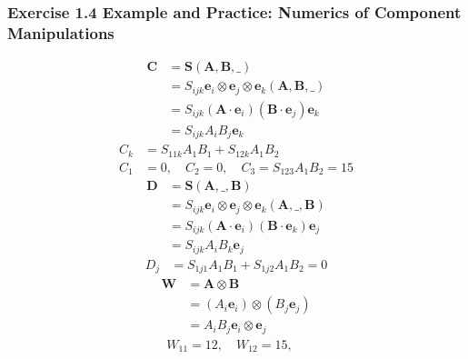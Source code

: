 \documentclass[10pt,a4paper]{book}
\theoremstyle{definition}
\begin{document}
\subsubsection{Exercise 1.4 Example and Practice: Numerics of Component Manipulations}
\begin{align}
    \mathbf{C}
    &=\mathbf{S}(\mathbf{A},\mathbf{B},\_)\\
    &=S_{ijk}\mathbf{e}_i\otimes\mathbf{e}_j\otimes\mathbf{e}_k(\mathbf{A},\mathbf{B},\_)\\
    &=S_{ijk}(\mathbf{A}\cdot\mathbf{e}_i)(\mathbf{B}\cdot\mathbf{e}_j)\mathbf{e}_k\\
    &=S_{ijk}A_iB_j\mathbf{e}_k
\end{align}
\begin{align}
    C_k&=S_{11k}A_1B_1+S_{12k}A_1B_2\\
    C_1&=0,\quad C_2=0,\quad C_3=S_{123}A_1B_2=15
\end{align}
\begin{align}
    \mathbf{D}
    &=\mathbf{S}(\mathbf{A},\_,\mathbf{B})\\
    &=S_{ijk}\mathbf{e}_i\otimes\mathbf{e}_j\otimes\mathbf{e}_k(\mathbf{A},\_,\mathbf{B})\\
    &=S_{ijk}(\mathbf{A}\cdot\mathbf{e}_i)(\mathbf{B}\cdot\mathbf{e}_k)\mathbf{e}_j\\
    &=S_{ijk}A_iB_k\mathbf{e}_j
\end{align}
\begin{align}
    D_j&=S_{1j1}A_1B_1 + S_{1j2}A_1B_2=0
\end{align}
\begin{align}
    \mathbf{W}
    &=\mathbf{A}\otimes\mathbf{B}\\
    &=(A_i\mathbf{e}_i)\otimes(B_j\mathbf{e}_j)\\
    &=A_iB_j \mathbf{e}_i\otimes\mathbf{e}_j
\end{align}
\begin{align}
    W_{11}=12,\quad W_{12}=15,\quad 
\end{align}
\end{document}
